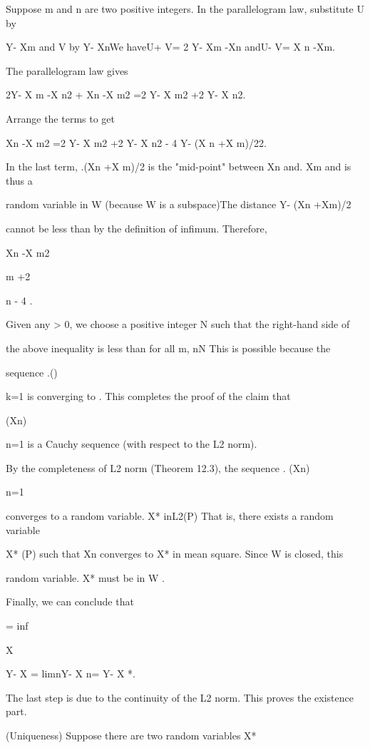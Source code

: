 Suppose m and n are two positive integers. In the parallelogram law, substitute U by

Y- Xm and V by Y- XnWe haveU+ V= 2 Y- Xm -Xn andU- V= X n -Xm.

The parallelogram law gives

2Y- X m -X n2 + Xn -X m2 =2 Y- X m2 +2 Y- X n2.

Arrange the terms to get

Xn -X m2 =2 Y- X m2 +2 Y- X n2 - 4 Y- (X n +X m)/22.

In the last term, .(Xn +X m)/2 is the "mid-point" between Xn and. Xm and is thus a

random variable in W (because W is a subspace)The distance Y- (Xn +Xm)/2

cannot be less than \alpha by the definition of infimum. Therefore,

Xn -X m2  

m +2 

n - 4 .

Given any \epsilon> 0, we choose a positive integer N such that the right-hand side of

the above inequality is less than \epsilon for all m, n\geq N This is possible because the

sequence .(\alphak)\infty

k=1 is converging to \alpha. This completes the proof of the claim that

(Xn)\infty

n=1 is a Cauchy sequence (with respect to the L2 norm).

By the completeness of L2 norm (Theorem 12.3), the sequence . (Xn)\infty

n=1

converges to a random variable. X* inL2(P) That is, there exists a random variable

X* (P) such that Xn converges to X* in mean square. Since W is closed, this

random variable. X* must be in W .

Finally, we can conclude that

\alpha= inf

X\inW

Y- X = limn\to\infty Y- X n= Y- X *.

The last step is due to the continuity of the L2 norm. This proves the existence part.

(Uniqueness) Suppose there are two random variables X*


